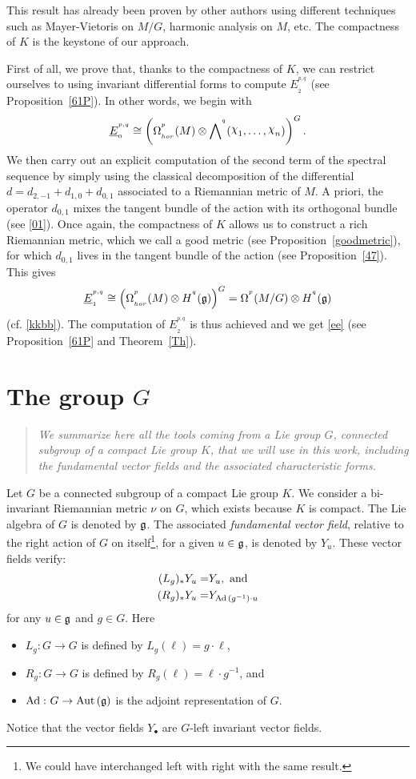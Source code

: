 \documentclass[a4paper,oneside,10pt,reqno]{amsart}
\theoremstyle{definition}
\newcommand{\propref}[1]{Proposition~\ref{#1}}
\newcommand{\thmref}[1]{Theorem~\ref{#1}}
\newcommand{\g}{\noindent {\mathfrak{g}}}
\newcommand{\Aut}{\mathop{\rm Aut \, } \nolimits}
\newcommand{\Ad}{\mathop{\rm Ad \, } \nolimits}
\newcommand\chii{\raise2pt\hbox{$\chi$}}
\newcommand\Om{\Omega}
\newcommand\BE{\underline E}
\newcommand{\bi}[2]{{#1}^{^{#2}}}
\newcommand{\hiru}[3]{{#1}^{^{#2}}_{_{#3}}}
\newcommand{\lau}[4]{{#1}^{^{#2}}_{_{#3}}{\left( #4 \right)}}
\newcommand{\coho}[3]{{#1}^{^{#2}}{\left( #3 \right)}}
\begin{document}
This result has already been proven by other authors \cite{MR658304,MR974012,razny} using different techniques such as Mayer-Vietoris on $M/G$, harmonic analysis on $M$, etc.
The compactness of $K$ is the keystone of our approach.

First of all, we prove that, thanks to the compactness of 
$K$, we can restrict ourselves to using invariant differential forms to compute $\hiru{E}{p,q}{2}$ (see \propref{61P}).
In other words, we begin with
$$
 \hiru{\BE}{p,q}{0} 
 \cong
 \left(\lau \Om p{hor} M \otimes \bi \bigwedge q(\chii_1, \ldots,\chii_n)\right)^G.
 $$
We then carry out an explicit computation of the second term of the spectral sequence by simply using the classical decomposition of the differential
$d = d_{2,-1} + d_{1,0}+d_{0,1}$ associated to a Riemannian  metric of $M$. A priori, the operator $d_{0,1}$ mixes the tangent bundle of the action with its orthogonal bundle
(see \eqref{01}). 
Once again, the compactness of $K$ allows us to construct a rich Riemannian  metric, which we call a good metric (see \propref{goodmetric}), for which $d_{0,1}$ lives in the tangent bundle of the action (see \propref{47}). 
This gives 
$$
 \hiru{\BE}{p,q}{1} 
 \cong
\left(
 \lau \Om p {hor} M\otimes \coho H q \g
  \right)^G 
=
   \coho {\Om} p {M/G} \otimes \coho H q {\g} $$
   (cf. \eqref{kkbb}).
 The computation of $\hiru{E}{p,q}{2}$  is thus achieved  and we get \eqref{ee} (see \propref{61P} and \thmref{Th}).


\section{The group $G$}\label{222}
\begin{quote}\emph{We summarize here all the tools coming from a Lie group $G$, connected subgroup of a compact Lie group $K$, that we will use in this work, including the fundamental vector fields and the associated characteristic forms.
}
\end{quote} 


 Let $G$ be a connected subgroup of a compact Lie group $K$.
We consider a bi-invariant Riemannian  metric $\nu$ on $G$, which exists because $K$ is compact. The Lie algebra of $G$ is denoted by $\g$.
The associated \emph{fundamental vector field}, relative to the right action of $G$ on itself\footnote{We could have interchanged left with right with the same result.}, for a given $u\in \g$, is denoted by $Y_u$. 
These vector fields verify:
\begin{align*}
(L_g)_* Y_u =& Y_u ,
\hbox{ and}\\
 (R_g)_*Y_u =& Y_{\Ad(g^{-1})\cdot u}
\end{align*}
for any $u\in \g$ and $ g\in G$. Here 
\begin{itemize}
\item $L_g \colon G \to G$ is defined by $L_g(\ell) = g\cdot \ell$,
\item $R_g \colon G \to G$ is defined by $R_g(\ell) = \ell \cdot g^{-1}$, and
\item 
 $\Ad\colon G \to \Aut(\g)$ is the adjoint representation of $G$.
 \end{itemize}
 Notice that the vector fields $Y_\bullet$ are $G$-left invariant vector fields.
\end{document}
